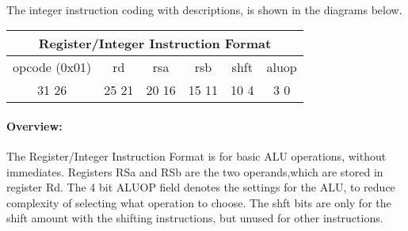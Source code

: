 \documentclass[letterpaper, 11pt]{article}
\begin{document}
\paragraph{}The integer instruction coding with descriptions, is shown in the diagrams below.

\begin{center}
		\begin{tabular}{|c|c|c|c|c|c|}
			\multicolumn{6}{c}{Register/Integer Instruction Format}\\ \hline
				\hspace{2pt} opcode (0x01) \hspace{2pt} & \hspace{5pt} rd \hspace{5pt} &  \hspace{4pt} rsa \hspace{4pt} & \hspace{4pt}rsb  \hspace{4pt}& \hspace{10pt}shft  \hspace{10pt} & \hspace{3pt} aluop \hspace{3pt}   \\	\hline
			31 \hfill 26& 25 \hfill 21 &20 \hfill  16& 15 \hfill  11&10 \hfill   4&3 \hfill   0\\ \hline
		
	\end{tabular}
\end{center}	
\paragraph{Overview:}The Register/Integer Instruction Format is for basic ALU operations, without immediates. Registers RSa and RSb are the two operands,which
are stored in register Rd. The 4 bit ALUOP field denotes the settings for the ALU, to reduce complexity of selecting what operation to choose.
The shft bits are only for the shift amount with the shifting instructions, but unused for other instructions. 
\end{document}
